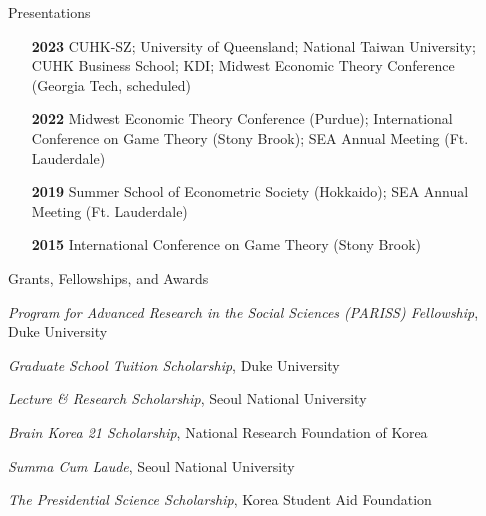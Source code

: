 \begin{rSection}{Presentations}
	
	\begin{itemize}
		\item [\textbf{2023}] CUHK-SZ; University of Queensland; National Taiwan University; CUHK Business School; KDI; Midwest Economic Theory Conference (Georgia Tech, scheduled)
		\item [\textbf{2022}] Midwest Economic Theory Conference (Purdue); International Conference on Game Theory (Stony Brook); SEA Annual Meeting (Ft. Lauderdale)
		\item [\textbf{2019}] Summer School of Econometric Society (Hokkaido); SEA Annual Meeting (Ft. Lauderdale)
		\item [\textbf{2015}] International Conference on Game Theory (Stony Brook)
	\end{itemize}
	
	
\end{rSection}
\medskip

\begin{rSection}{Grants, Fellowships, and Awards}
	
	\begin{etaremune}
		
		\item \textit{Program for Advanced Research in the Social Sciences (PARISS) Fellowship}, Duke University 
		
		
		\item \textit{Graduate School Tuition Scholarship}, Duke University 
		\item \textit{Lecture \& Research Scholarship}, Seoul National University 
		\item \textit{Brain Korea 21 Scholarship}, National Research Foundation of Korea 
		\item \textit{Summa Cum Laude}, Seoul National University 
		\item  \textit{The Presidential Science Scholarship}, Korea Student Aid Foundation 
	\end{etaremune}
	
	
\end{rSection}
\medskip

